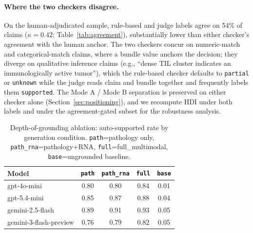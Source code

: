 \documentclass{article}
\theoremstyle{plain}
\begin{document}
\paragraph{Where the two checkers disagree.}
On the human-adjudicated sample, rule-based and judge labels agree on 54\% of claims ($\kappa{=}0.42$; Table~\ref{tab:agreement}), substantially lower than either checker's agreement with the human anchor. The two checkers concur on numeric-match and categorical-match claims, where a bundle value anchors the decision; they diverge on qualitative inference claims (e.g., ``dense TIL cluster indicates an immunologically active tumor''), which the rule-based checker defaults to \texttt{partial} or \texttt{unknown} while the judge reads claim and bundle together and frequently labels them \texttt{supported}. The Mode A / Mode B separation is preserved on either checker alone (Section~\ref{sec:positioning}), and we recompute HDI under both labels and under the agreement-gated subset for the robustness analysis.

\begin{table}[!t]
\centering
\small
\setlength{\tabcolsep}{4pt}
\begin{tabular}{lcccc}
\toprule
\textbf{Model} & \texttt{path} & \texttt{path\_rna} & \texttt{full} & \texttt{base} \\
\midrule
gpt-4o-mini             & 0.80 & 0.80 & 0.84 & 0.01 \\
gpt-5.4-mini            & 0.85 & 0.87 & 0.88 & 0.04 \\
gemini-2.5-flash        & 0.89 & 0.91 & 0.93 & 0.05 \\
gemini-3-flash-preview  & 0.76 & 0.79 & 0.82 & 0.05 \\
\bottomrule
\end{tabular}
\caption{Depth-of-grounding ablation: auto-supported rate by generation condition. \texttt{path}=pathology only, \texttt{path\_rna}=pathology$+$RNA, \texttt{full}=full\_multimodal, \texttt{base}=ungrounded baseline.}
\label{tab:gradient}
\end{table}
\end{document}
